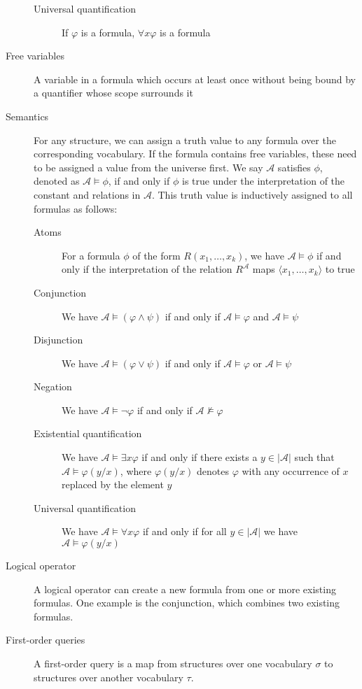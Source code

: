 \begin{description}
\begin{description}
        \item[Universal quantification] If $\varphi$ is a formula, $\forall x \varphi$ is a formula
    \end{description}
    \item[Free variables] A variable in a formula which occurs at least once without being bound by a quantifier whose scope surrounds it
    \item[Semantics] For any structure, we can assign a truth value to any formula over the corresponding vocabulary.
    If the formula contains free variables, these need to be assigned a value from the universe first.
    We say $\mathcal{A}$ satisfies $\phi$, denoted as $\mathcal{A} \models \phi$, if and only if $\phi$ is true under the interpretation of the constant and relations in $\mathcal{A}$.
    This truth value is inductively assigned to all formulas as follows:
    \begin{description}
        \item[Atoms] For a formula $\phi$ of the form $R(x_1, \dots, x_k)$, we have $\mathcal{A} \models \phi$ if and only if the interpretation of the relation $R^{\mathcal{A}}$ maps $\langle x_1, \dots, x_k \rangle$ to true
        \item[Conjunction] We have $\mathcal{A} \models (\varphi \land \psi)$ if and only if $\mathcal{A} \models \varphi$ and $\mathcal{A} \models \psi$
        \item[Disjunction]  We have $\mathcal{A} \models (\varphi \lor \psi)$ if and only if $\mathcal{A} \models \varphi$ or $\mathcal{A} \models \psi$
        \item[Negation] We have $\mathcal{A} \models \lnot \varphi$ if and only if $\mathcal{A} \not\models \varphi$
        \item[Existential quantification] We have $\mathcal{A} \models \exists x\varphi$ if and only if there exists a $y \in |\mathcal{A}|$ such that $\mathcal{A} \models \varphi(y / x)$, where $\varphi(y / x)$ denotes $\varphi$ with any occurrence of $x$ replaced by the element $y$
        \item[Universal quantification] We have $\mathcal{A} \models \forall x\varphi$ if and only if for all $y \in |\mathcal{A}|$ we have $\mathcal{A} \models \varphi(y / x)$
    \end{description}
    \item[Logical operator] A logical operator can create a new formula from one or more existing formulas.
    One example is the conjunction, which combines two existing formulas.
    \item[First-order queries] A first-order query is a map from structures over one vocabulary $\sigma$ to structures over another vocabulary $\tau$.

\end{description}
